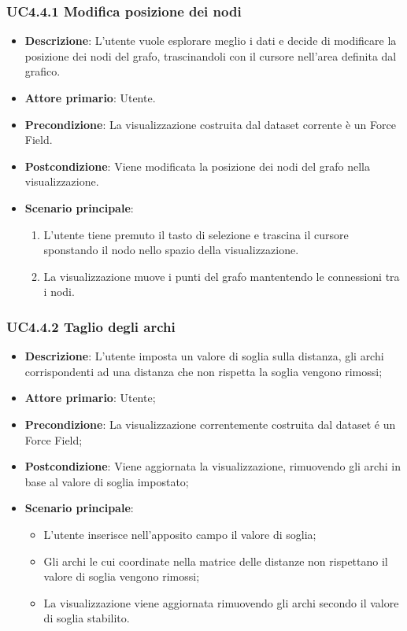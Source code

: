 \subsubsection{UC4.4.1 Modifica posizione dei nodi}
\label{ssub:uc4.4.1}
\begin{itemize}
    \item \textbf{Descrizione}: L’utente vuole esplorare meglio i dati e decide di 
                                modificare la posizione dei nodi del grafo, trascinandoli con il 
                                cursore nell'area definita dal grafico.
	
    \item \textbf{Attore primario}: Utente.
    
    \item \textbf{Precondizione}:   La visualizzazione costruita dal dataset corrente è un Force Field.
    \item \textbf{Postcondizione}:  Viene modificata la posizione dei nodi del grafo nella visualizzazione.

	\item \textbf{Scenario principale}:
        \begin{enumerate}
            \item L'utente tiene premuto il tasto di selezione e trascina il cursore sponstando il nodo nello spazio della visualizzazione.
            \item La visualizzazione muove i punti del grafo mantentendo le connessioni tra i nodi.
        \end{enumerate}
\end{itemize}

\subsubsection{UC4.4.2 Taglio degli archi}
\label{ssub:uc4.4.2}
\begin{itemize}
    \item \textbf{Descrizione}:     L'utente imposta un valore di soglia sulla distanza, gli archi corrispondenti ad una distanza che non rispetta la soglia vengono rimossi;
    \item \textbf{Attore primario}: Utente;
    \item \textbf{Precondizione}:   La visualizzazione correntemente costruita dal dataset é un Force Field;
    \item \textbf{Postcondizione}:  Viene aggiornata la visualizzazione, rimuovendo gli archi in base al valore di soglia impostato;
    \item \textbf{Scenario principale}:
    \begin{itemize}
        \item L'utente inserisce nell'apposito campo il valore di soglia;
        \item Gli archi le cui coordinate nella matrice delle distanze non rispettano il valore di soglia vengono rimossi;
        \item La visualizzazione viene aggiornata rimuovendo gli archi secondo il valore di soglia stabilito.
    \end{itemize}
\end{itemize}

